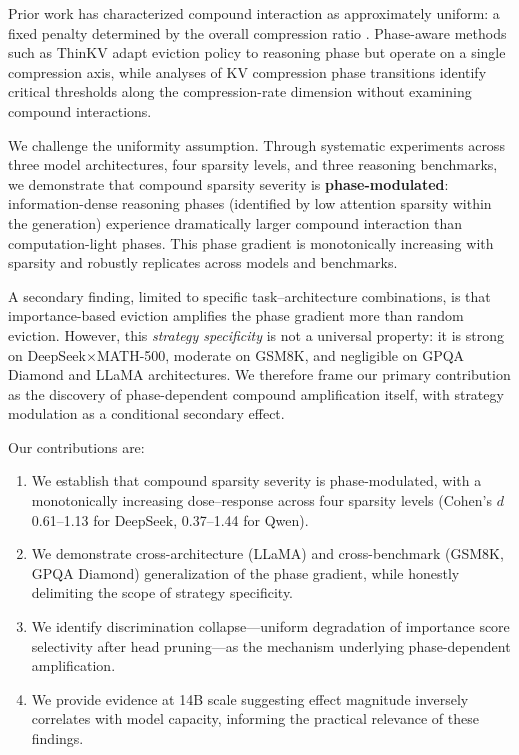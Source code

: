 \documentclass[11pt,a4paper]{article}
\begin{document}
Prior work has characterized compound interaction as approximately uniform: a fixed penalty determined by the overall compression ratio \cite{he2024sparseattn}. Phase-aware methods such as ThinKV \cite{xu2025thinkv} adapt eviction policy to reasoning phase but operate on a single compression axis, while analyses of KV compression phase transitions \cite{devoto2026physics} identify critical thresholds along the compression-rate dimension without examining compound interactions.

We challenge the uniformity assumption. Through systematic experiments across three model architectures, four sparsity levels, and three reasoning benchmarks, we demonstrate that compound sparsity severity is \textbf{phase-modulated}: information-dense reasoning phases (identified by low attention sparsity within the generation) experience dramatically larger compound interaction than computation-light phases. This phase gradient is monotonically increasing with sparsity and robustly replicates across models and benchmarks.

A secondary finding, limited to specific task--architecture combinations, is that importance-based eviction amplifies the phase gradient more than random eviction. However, this \emph{strategy specificity} is not a universal property: it is strong on DeepSeek$\times$MATH-500, moderate on GSM8K, and negligible on GPQA Diamond and LLaMA architectures. We therefore frame our primary contribution as the discovery of phase-dependent compound amplification itself, with strategy modulation as a conditional secondary effect.

Our contributions are:
\begin{enumerate}[nosep]
    \item We establish that compound sparsity severity is phase-modulated, with a monotonically increasing dose--response across four sparsity levels (Cohen's $d$ 0.61--1.13 for DeepSeek, 0.37--1.44 for Qwen).
    \item We demonstrate cross-architecture (LLaMA) and cross-benchmark (GSM8K, GPQA Diamond) generalization of the phase gradient, while honestly delimiting the scope of strategy specificity.
    \item We identify discrimination collapse---uniform degradation of importance score selectivity after head pruning---as the mechanism underlying phase-dependent amplification.
    \item We provide evidence at 14B scale suggesting effect magnitude inversely correlates with model capacity, informing the practical relevance of these findings.
\end{enumerate}
\end{document}
